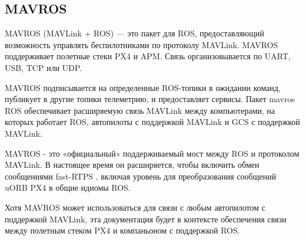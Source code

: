 \subsection{MAVROS}

MAVROS (MAVLink + ROS) — это пакет для ROS, предоставляющий возможность управлять беспилотниками по протоколу MAVLink. MAVROS поддерживает полетные стеки PX4 и APM. Связь организовывается по UART, USB, TCP или UDP.

MAVROS подписывается на определенные ROS-топики в ожидании команд, публикует в другие топики телеметрию, и предоставляет сервисы.
Пакет mavros ROS обеспечивает расширяемую связь MAVLink между компьютерами, на которых работает ROS, автопилоты с поддержкой MAVLink и GCS с поддержкой MAVLink.

MAVROS - это «официальный» поддерживаемый мост между ROS и протоколом MAVLink. В настоящее время он расширяется, чтобы включить обмен сообщениями fast-RTPS , включая уровень для преобразования сообщений uORB PX4 в общие идиомы ROS.

Хотя MAVROS может использоваться для связи с любым автопилотом с поддержкой MAVLink, эта документация будет в контексте обеспечения связи между полетным стеком PX4 и компаньоном с поддержкой ROS.
